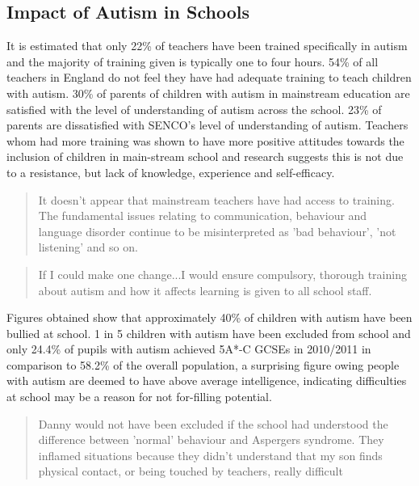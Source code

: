 \subsection{Impact of Autism in Schools}
It is estimated that only 22\% of teachers have been trained specifically in autism and the majority of training given is typically one to four hours\cite{nasschool}. 54\% of all teachers in England do not feel they have had adequate training to teach children with autism.\cite{statsandfacts} 30\% of parents of children with autism in mainstream education are satisfied with the level of understanding of autism across the school\cite{nasschool}. 23\% of parents are dissatisfied with SENCO's level of understanding of autism. Teachers whom had more training was shown to have more positive attitudes towards the inclusion of children in main-stream school and research suggests this is not due to a resistance, but lack of knowledge, experience and self-efficacy\cite{teachersinclusion}.

\begin{quote}
It doesn't appear that mainstream teachers have had access to training. The fundamental issues relating to communication, behaviour and language disorder continue to be misinterpreted as 'bad behaviour', 'not listening' and so on.\cite{nasschool}
\end{quote}

\begin{quote}
If I could make one change...I would ensure compulsory, thorough training about autism and how it affects learning is given to all school staff. \cite{nasschool}
\end{quote}

Figures obtained show that approximately 40\% of children with autism have been bullied at school. 1 in 5 children with autism have been excluded from school \cite{nasschool} and only 24.4\% of pupils with autism achieved 5A*-C GCSEs in 2010/2011 in comparison to 58.2\% of the overall population\cite{statsandfacts}, a surprising figure owing people with autism are deemed to have above average intelligence, indicating difficulties at school may be a reason for not for-filling potential. 

\begin{quote}
Danny would not have been excluded if the school had understood the difference between 'normal' behaviour and Aspergers syndrome. They inflamed situations because they didn't understand that my son finds physical contact, or being touched by teachers, really difficult \cite{nasschool}
\end{quote}


